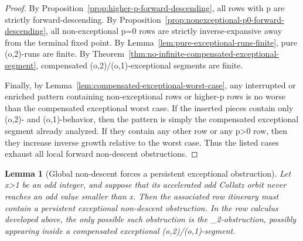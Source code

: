 \documentclass[11pt,letterpaper]{amsart}
\def\({}%
\def\){}%
\theoremstyle{definition}
\theoremstyle{plain}
\newtheorem{lemma}{Lemma}
\theoremstyle{plain}
\theoremstyle{remark}
\begin{document}
\begin{proof}
By Proposition~\ref{prop:higher-p-forward-descending}, all rows with
\(p\) are strictly forward-descending.  By
Proposition~\ref{prop:nonexceptional-p0-forward-descending}, all
non-exceptional \(p=0\) rows are strictly inverse-expansive away from
the terminal fixed point.  By
Lemma~\ref{lem:pure-exceptional-runs-finite}, pure \((o,2)\)-runs are
finite.  By
Theorem~\ref{thm:no-infinite-compensated-exceptional-segment},
compensated \((o,2)/(o,1)\)-exceptional segments are finite.

Finally, by Lemma~\ref{lem:compensated-exceptional-worst-case}, any
interrupted or enriched pattern containing non-exceptional rows or
higher-\(p\) rows is no worse than the compensated exceptional worst case.
If the inserted pieces contain only \((o,2)\)- and \((o,1)\)-behavior,
then the pattern is simply the compensated exceptional segment already
analyzed.  If they contain any other row or any \(p>0\) row, then they
increase inverse growth relative to the worst case.  Thus the listed
cases exhaust all local forward non-descent obstructions.
\end{proof}


\begin{lemma}[Global non-descent forces a persistent exceptional obstruction]
\label{lem:global-nondesc-persistent-obstruction}
Let \(x>1\) be an odd integer, and suppose that its accelerated odd
Collatz orbit never reaches an odd value smaller than \(x\).  Then the
associated row itinerary must contain a persistent exceptional
non-descent obstruction.  In the row calculus developed above, the only
possible such obstruction is the \(\Omega_2\)-obstruction, possibly
appearing inside a compensated exceptional \((o,2)/(o,1)\)-segment.
\end{lemma}
\end{document}
